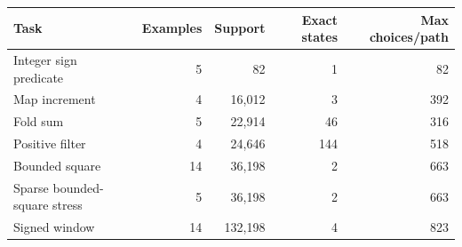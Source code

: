 \begin{tabular}{lrrrr}
\toprule
Task & Examples & Support & Exact states & Max choices/path \\
\midrule
Integer sign predicate & 5 & 82 & 1 & 82 \\
Map increment & 4 & 16,012 & 3 & 392 \\
Fold sum & 5 & 22,914 & 46 & 316 \\
Positive filter & 4 & 24,646 & 144 & 518 \\
Bounded square & 14 & 36,198 & 2 & 663 \\
Sparse bounded-square stress & 5 & 36,198 & 2 & 663 \\
Signed window & 14 & 132,198 & 4 & 823 \\
\bottomrule
\end{tabular}
